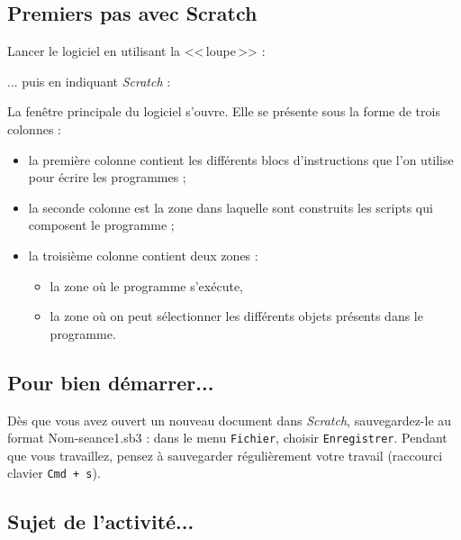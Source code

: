\subsection{Premiers pas avec Scratch}

Lancer le logiciel en utilisant la <<\,loupe\,>> :


... puis en indiquant \emph{Scratch} :



La fenêtre principale du logiciel s'ouvre. Elle se présente sous la forme de trois colonnes :

\begin{itemize}
\item la première colonne contient les différents blocs d'instructions que l'on utilise pour écrire les programmes ;
\item la seconde colonne est la zone dans laquelle sont construits les scripts qui composent le programme ;
\item la troisième colonne contient deux zones :
        \begin{itemize}
        \item la zone où le programme s'exécute,
        \item la zone où on peut sélectionner les différents objets présents dans le programme.
        \end{itemize}
\end{itemize}




%
%
%
%


\subsection{Pour bien démarrer...}

Dès que vous avez ouvert un nouveau document dans \emph{Scratch}, sauvegardez-le au format Nom-seance1.sb3 : dans le menu \texttt{Fichier}, choisir \texttt{Enregistrer}. Pendant que vous travaillez, pensez à sauvegarder régulièrement votre travail (raccourci clavier \texttt{Cmd + s}).   



\subsection{Sujet de l'activité...}

